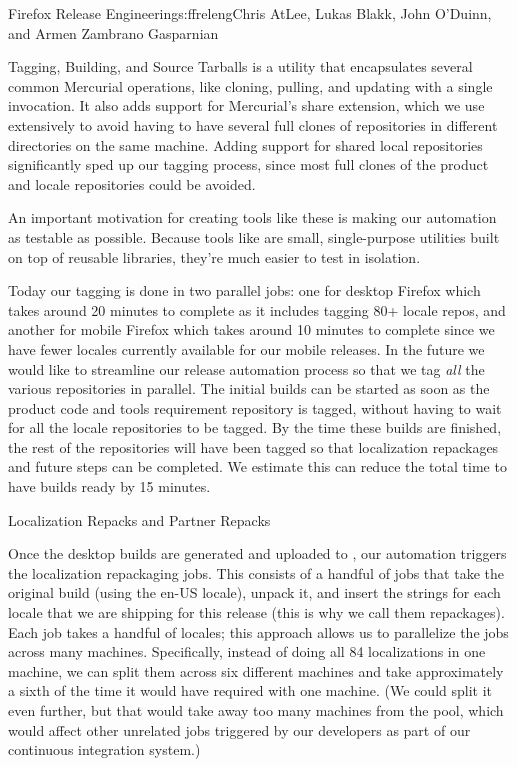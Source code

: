 \begin{aosachapter}{Firefox Release Engineering}{s:ffreleng}{Chris AtLee, Lukas Blakk, John O'Duinn, and Armen Zambrano Gasparnian}
\begin{aosasect1}{Tagging, Building, and Source Tarballs}
 is a utility that encapsulates several common Mercurial
operations, like cloning, pulling, and updating with a single invocation. It
also adds support for Mercurial's share extension, which we use extensively
to avoid having to have several full clones of repositories in
different directories on the same machine.  Adding support for shared
local repositories significantly sped up our tagging process, since most
full clones of the product and locale repositories could be avoided.
    
An important motivation for creating tools like these is 
making our automation as testable as possible. Because tools like
 are small, single-purpose utilities built on top of
reusable libraries, they're much easier to test in isolation.

Today our tagging is done in two parallel jobs: one for desktop
Firefox which takes around 20 minutes to complete as it includes
tagging 80+ locale repos, and another for mobile Firefox which takes
around 10 minutes to complete since we have fewer locales currently
available for our mobile releases. In the future we would like to
streamline our release automation process so that we tag \emph{all}
the various repositories in parallel. The initial builds can be
started as soon as the product code and tools requirement
repository is tagged, without having to wait for all the locale
repositories to be tagged. By the time these builds are finished, the
rest of the repositories will have been tagged so that localization
repackages and future steps can be completed.  We estimate this can
reduce the total time to have builds ready by 15 minutes.

\end{aosasect1}

\begin{aosasect1}{Localization Repacks and Partner Repacks}


Once the desktop builds are generated and uploaded to
, our automation triggers the localization
repackaging jobs. This consists of a handful of jobs that take the
original build (using the en-US locale), unpack it, and insert
the strings for each locale that we are shipping for this release
(this is why we call them repackages). Each job takes a handful of
locales; this approach allows us to parallelize the jobs across many
machines. Specifically, instead of doing all 84 localizations in
one machine, we can split them across six different machines and take
approximately a sixth of the time it would have required with
one machine. (We could split it even further, but that would take away too
many machines from the pool, which would affect other unrelated jobs
triggered by our developers as part of our continuous integration
system.)
    

\end{aosasect1}
\end{aosachapter}
